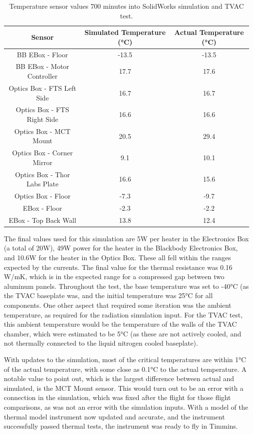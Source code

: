 \begin{table}[h]
\begin{center}
\begin{tabular}{ |c|c|c| }
 \hline
 \rowcolor{lightgray}
 Sensor & Simulated Temperature (°C) & Actual Temperature (°C)\\
  \hline
  \hline
  BB EBox - Floor & -13.5 & -13.5\\
 \hline
  BB EBox - Motor Controller & 17.7 & 17.6\\
 \hline
 Optics Box - FTS Left Side & 16.7 & 16.7\\
 \hline
 Optics Box - FTS Right Side & 16.6 & 16.6\\
 \hline
 Optics Box - MCT Mount & 20.5 & 29.4\\
 \hline
 Optics Box - Corner Mirror & 9.1 & 10.1\\
 \hline
 Optics Box - Thor Labs Plate & 16.6 & 15.6\\
 \hline
 Optics Box - Floor & -7.3 & -9.7\\
 \hline
 EBox - Floor & -2.3 & -2.2\\
 \hline
 EBox - Top Back Wall & 13.8 & 12.4\\
 \hline
\end{tabular}
\end{center}
\caption{Temperature sensor values 700 minutes into SolidWorks simulation and TVAC test.}
 \label{TVAC_temps}
\end{table}

The final values used for this simulation are 5W per heater in the Electronics Box (a total of 20W), 49W power for the heater in the Blackbody Electronics Box, and 10.6W for the heater in the Optics Box. These all fell within the ranges expected by the currents. The final value for the thermal resistance was 0.16 W/mK, which is in the expected range for a compressed gap between two aluminum panels. Throughout the test, the base temperature was set to -40°C (as the TVAC baseplate was, and the initial temperature was 25°C for all components. One other aspect that required some iteration was the ambient temperature, as required for the radiation simulation input. For the TVAC test, this ambient temperature would be the temperature of the walls of the TVAC chamber, which were estimated to be 5°C (as these are not actively cooled, and not thermally connected to the liquid nitrogen cooled baseplate).

With updates to the simulation, most of the critical temperatures are within 1°C of the actual temperature, with some close as 0.1°C to the actual temperature. A notable value to point out, which is the largest difference between actual and simulated, is the MCT Mount sensor. This would turn out to be an error with a connection in the simulation, which was fixed after the flight for those flight comparisons, as was not an error with the simulation inputs. With a model of the thermal model instrument now updated and accurate, and the instrument successfully passed thermal tests, the instrument was ready to fly in Timmins.

